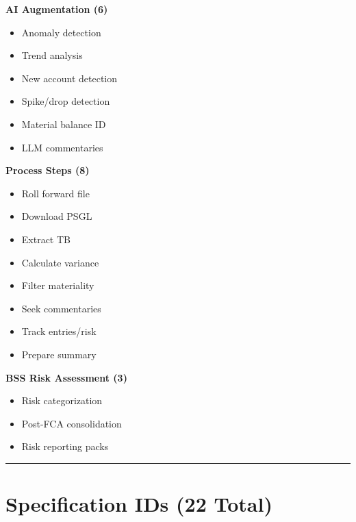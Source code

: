 \begin{tcolorbox}[colback=white,colframe=sapblue,title=\textbf{TB-HITL Quick Reference Card --- Print \& Keep}]
\begin{minipage}[t]{0.48\textwidth}
\textbf{AI Augmentation (6)}
\begin{itemize}[noitemsep,leftmargin=*]
  \item {} Anomaly detection
  \item {} Trend analysis
  \item {} New account detection
  \item {} Spike/drop detection
  \item {} Material balance ID
  \item {} LLM commentaries
\end{itemize}
\end{minipage}%
\hfill
\begin{minipage}[t]{0.48\textwidth}
\textbf{Process Steps (8)}
\begin{itemize}[noitemsep,leftmargin=*]
  \item {} Roll forward file
  \item {} Download PSGL
  \item {} Extract TB
  \item {} Calculate variance
  \item {} Filter materiality
  \item {} Seek commentaries
  \item {} Track entries/risk
  \item {} Prepare summary
\end{itemize}

\textbf{BSS Risk Assessment (3)}
\begin{itemize}[noitemsep,leftmargin=*]
  \item {} Risk categorization
  \item {} Post-FCA consolidation
  \item {} Risk reporting packs
\end{itemize}
\end{minipage}

\vspace{0.3cm}
\hrule
\vspace{0.3cm}

\section*{Specification IDs (22 Total)}


\end{tcolorbox}
